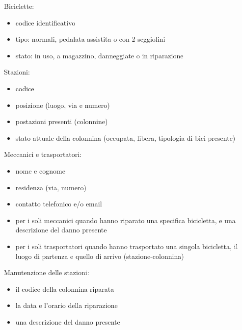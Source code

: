 \documentclass[a4paper,twoside]{article}
\begin{document}
Biciclette:
\begin{itemize}
 \item codice identificativo
 \item tipo: normali, pedalata assistita o con 2 seggiolini
 \item stato: in uso, a magazzino, danneggiate o in riparazione %
\end{itemize}
Stazioni:
\begin{itemize}
 \item codice
 \item posizione (luogo, via e numero)
 \item postazioni presenti (colonnine)
 \item stato attuale della colonnina (occupata, libera, tipologia di bici presente) %
\end{itemize}
Meccanici e trasportatori:
\begin{itemize}
 \item nome e cognome
 \item residenza (via, numero)
 \item contatto telefonico e/o email
 \item per i soli meccanici quando hanno riparato una specifica bicicletta, e una descrizione del danno presente %
 \item per i soli trasportatori quando hanno trasportato una singola bicicletta, il luogo di partenza e quello di arrivo (stazione-colonnina)
\end{itemize}
Manutenzione delle stazioni:
\begin{itemize}
 \item il codice della colonnina riparata
 \item la data e l'orario della riparazione
 \item una descrizione del danno presente
\end{itemize}
\end{document}
